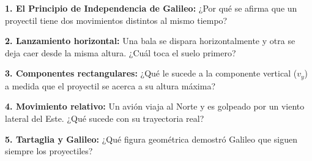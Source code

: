\documentclass[12pt, letterpaper]{article}
\newif\ifshowanswers
\newcommand{\respAbierta}[2][3cm]{
	\ifshowanswers
	\par\vspace{0.2cm}
	\textbf{\textcolor{blue}{Respuesta Esperada:}} \textcolor{blue}{#2}
	\par\vspace{0.2cm}
	\else
	\par\vspace{#1} %
	\fi
}
\begin{document}
	\vspace{0.3cm}
	\noindent \textbf{1. El Principio de Independencia de Galileo:} ¿Por qué se afirma que un proyectil tiene dos movimientos distintos al mismo tiempo?
	\respAbierta[3.5cm]{Es la superposición de dos movimientos independientes: 1) Un M.U. horizontal (velocidad constante) y 2) Un movimiento de caída libre/lanzamiento vertical (acelerado por la gravedad).}
	
	\vspace{0.2cm}
	\noindent \textbf{2. Lanzamiento horizontal:} Una bala se dispara horizontalmente y otra se deja caer desde la misma altura. ¿Cuál toca el suelo primero?
	\respAbierta[4cm]{Ambas tocan el suelo \textbf{al mismo tiempo}. La velocidad horizontal no afecta la caída vertical. Ambas inician con $v_{0y} = 0$ y caen la misma altura bajo la misma gravedad.}
	
	\vspace{0.2cm}
	\noindent \textbf{3. Componentes rectangulares:} ¿Qué le sucede a la componente vertical ($v_y$) a medida que el proyectil se acerca a su altura máxima?
	\respAbierta[3cm]{La componente $v_y$ disminuye progresivamente debido a la gravedad hasta que en el punto más alto se vuelve cero.}
	
	\vspace{0.2cm}
	\noindent \textbf{4. Movimiento relativo:} Un avión viaja al Norte y es golpeado por un viento lateral del Este. ¿Qué sucede con su trayectoria real?
	\respAbierta[3.5cm]{La trayectoria real será una diagonal (suma vectorial de las velocidades). Para un observador en tierra, el avión se desvía de su curso original y su velocidad total aumenta según el teorema de Pitágoras.}
	
	\vspace{0.2cm}
	\noindent \textbf{5. Tartaglia y Galileo:} ¿Qué figura geométrica demostró Galileo que siguen siempre los proyectiles?
	\respAbierta[3cm]{Galileo desmintió que los proyectiles se movieran en líneas rectas seguidas de caídas bruscas, demostrando matemáticamente que siguen una trayectoria en forma de \textbf{parábola}.}
	
	
\end{document}
